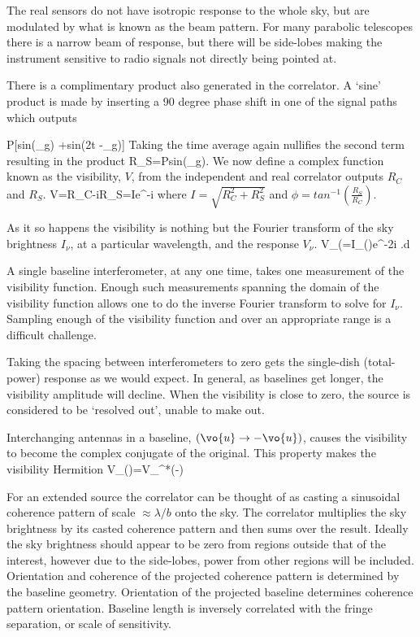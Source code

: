 The real sensors do not have isotropic response to the whole sky, but are modulated by what is known as the beam pattern.
For many parabolic telescopes there is a narrow beam of response, but there will be side-lobes making the instrument sensitive to radio signals not directly being pointed at.

There is a complimentary product also generated in the correlator.
A `sine' product is made by inserting a 90 degree phase shift in one of the signal paths which outputs

\be
P[sin(\omega \tau_g) +sin(2\omega t -\omega \tau_g)]
\ee
Taking the time average again nullifies the second term resulting in the product
\be
R_S=Psin(\omega \tau_g).
\ee
We now define a complex function known as the visibility, $V$, from the independent and real correlator outputs $R_C$ and $R_S$.
\be
V=R_C-iR_S=Ie^{-i\phi}
\ee
where $I=\sqrt{R_C^2 +R_S^2}$ and $\phi=tan^{-1}(\frac{R_S}{R_C})$.

As it so happens the visibility is nothing but the Fourier transform of the sky brightness $I_\nu$, at a particular wavelength, and the response $V_\nu$.
\be
V_\nu (=\int \int I_\nu ()e^{-2\pi i .}d
\ee

A single baseline interferometer, at any one time, takes one measurement of the visibility function.
Enough such measurements spanning the domain of the visibility function allows one to do the inverse Fourier transform to solve for $I_\nu$.
Sampling enough of the visibility function and over an appropriate range is a difficult challenge.

Taking the spacing between interferometers to zero gets the single-dish (total-power) response as we would expect.
In general, as baselines get longer, the visibility amplitude will decline.
When the visibility is close to zero, the source is considered to be `resolved out', unable to make out.

Interchanging antennas in a baseline, $(\vo{u}\rightarrow -\vo{u})$, causes the visibility to become the complex conjugate of the original.
This property makes the visibility Hermition
\be
V_\nu()=V_\nu^*(-)
\ee


For an extended source the correlator can be thought of as casting a sinusoidal coherence pattern of scale $\approx \lambda/b$ onto the sky.
The correlator multiplies the sky brightness by its casted coherence pattern and then sums over the result.
Ideally the sky brightness should appear to be zero from regions outside that of the interest, however due to the side-lobes, power from other regions will be included.
Orientation and coherence of the projected coherence pattern is determined by the baseline geometry.
Orientation of the projected baseline determines coherence pattern orientation.
Baseline length is inversely correlated with the fringe separation, or scale of sensitivity.

